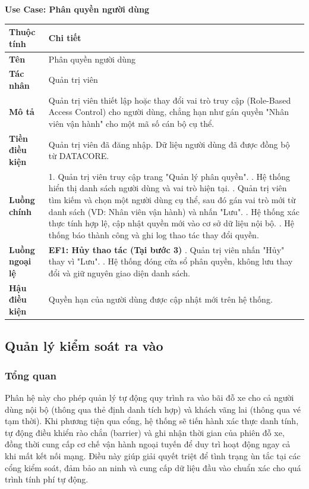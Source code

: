 \newpage
\noindent \textbf{Use Case: Phân quyền người dùng} \\
\renewcommand{\arraystretch}{1.6}
\begin{xltabular}{\textwidth}{|l|X|}
\hline
\textbf{Thuộc tính} & \textbf{Chi tiết} \\
\hline
\textbf{Tên} & Phân quyền người dùng \\
\hline
\textbf{Tác nhân} & Quản trị viên \\
\hline
\textbf{Mô tả} & Quản trị viên thiết lập hoặc thay đổi vai trò truy cập (Role-Based Access Control) cho người dùng, chẳng hạn như gán quyền "Nhân viên vận hành" cho một mã số cán bộ cụ thể. \\
\hline
\textbf{Tiền điều kiện} & Quản trị viên đã đăng nhập. Dữ liệu người dùng đã được đồng bộ từ DATACORE. \\
\hline
\textbf{Luồng chính} & 
1. Quản trị viên truy cập trang "Quản lý phân quyền". . Hệ thống hiển thị danh sách người dùng và vai trò hiện tại. . Quản trị viên tìm kiếm và chọn một người dùng cụ thể, sau đó gán vai trò mới từ danh sách (VD: Nhân viên vận hành) và nhấn "Lưu". . Hệ thống xác thực tính hợp lệ, cập nhật quyền mới vào cơ sở dữ liệu nội bộ. . Hệ thống báo thành công và ghi log thao tác thay đổi quyền. \\
\hline
\textbf{Luồng ngoại lệ} & 
\textbf{EF1: Hủy thao tác (Tại bước 3)} . Quản trị viên nhấn "Hủy" thay vì "Lưu". . Hệ thống đóng cửa sổ phân quyền, không lưu thay đổi và giữ nguyên giao diện danh sách. \\
\hline
\textbf{Hậu điều kiện} & Quyền hạn của người dùng được cập nhật mới trên hệ thống. \\
\hline
\end{xltabular}

\newpage
\subsection{Quản lý kiểm soát ra vào}

\subsubsection{Tổng quan}
Phân hệ này cho phép quản lý tự động quy trình ra vào bãi đỗ xe cho cả người dùng nội bộ (thông qua thẻ định danh tích hợp) và khách vãng lai (thông qua vé tạm thời). Khi phương tiện qua cổng, hệ thống sẽ tiến hành xác thực danh tính, tự động điều khiển rào chắn (barrier) và ghi nhận thời gian của phiên đỗ xe, đồng thời cung cấp cơ chế vận hành ngoại tuyến để duy trì hoạt động ngay cả khi mất kết nối mạng. Điều này giúp giải quyết triệt để tình trạng ùn tắc tại các cổng kiểm soát, đảm bảo an ninh và cung cấp dữ liệu đầu vào chuẩn xác cho quá trình tính phí tự động.

